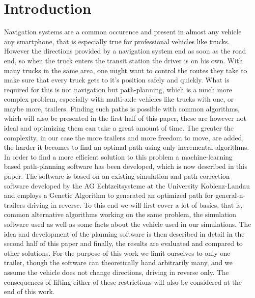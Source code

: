 \chapter{Introduction}
\label{cha:introduction}

Navigation systems are a common occurence and present in almost any vehicle any smartphone, that is especially true for professional vehicles like trucks. However the directions provided by a navigation system end as soon as the road end, so when the truck enters the transit station the driver is on his own. With many trucks in the same area, one might want to control the routes they take to make sure that every truck gets to it's position safely and quickly. What is required for this is not navigation but path-planning, which is a much more complex problem, especially with multi-axle vehicles like trucks with one, or maybe more, trailers. Finding such paths is possible with common algorithms, which will also be presented in the first half of this paper, these are however not ideal and optimizing them can take a great amount of time. The greater the complexity, in our case the more trailers and more freedom to move, are added, the harder it becomes to find an optimal path using only incremental algorithms. In order to find a more efficient solution to this problem a machine-learning based path-planning software has been developed, which is now described in this paper. The software is based on an existing simulation and path-correction software developed by the AG Echtzeitsysteme at the University Koblenz-Landau and employs a Genetic Algorithm to generated an optimized path for general-n-trailers driving in reverse. 
To this end we will first cover a lot of basics, that is, common alternative algorithms working on the same problem, the simulation software used as well as some facts about the vehicle used in our simulations. The idea and development of the planning software is then described in detail in the second half of this paper and finally, the results are evaluated and compared to other solutions. For the purpose of this work we limit ourselves to only one trailer, though the software can theoretically hand arbitrarily many, and we assume the vehicle does not change directions, driving in reverse only. The consequences of lifting either of these restrictions will also be considered at the end of this work.
